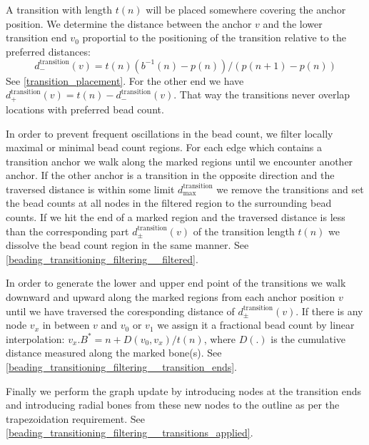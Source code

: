 A transition with length $t(n)$ will be placed somewhere covering the anchor position.
We determine the distance between the anchor $v$ and the lower transition end $v_0$ proportial to the positioning of the transition relative to the preferred distances: 
$$d_-^\text{transition}(v) =  t(n) (b^{-1}(n) - p(n) ) / (p(n+1) - p(n))$$
See \cref{transition_placement}.
For the other end we have $d_+^\text{transition}(v) = t(n) - d_-^\text{transition}(v)$.
That way the transitions never overlap locations with preferred bead count.

In order to prevent frequent oscillations in the bead count, we filter locally maximal or minimal bead count regions.
For each edge which contains a transition anchor we walk along the marked regions until we encounter another anchor.
If the other anchor is a transition in the opposite direction and the traversed distance is within some limit $d_\text{max}^\text{transition}$ we remove the transitions and set the bead counts at all nodes in the filtered region to the surrounding bead counts.
If we hit the end of a marked region and the traversed distance is less than the corresponding part $d_\pm^\text{transition}(v)$ of the transition length $t(n)$ we dissolve the bead count region in the same manner.
See \cref{beading_transitioning_filtering__filtered}.


In order to generate the lower and upper end point of the transitions we walk downward and upward along the marked regions from each anchor position $v$ until we have traversed the coresponding distance of $d_\pm^\text{transition}(v)$.
If there is any node $v_x$ in between $v$ and $v_0$ or $v_1$ we assign it a fractional bead count by linear interpolation: $v_x.B^* = n + D(v_0, v_x)/t(n)$, where $D(.)$ is the cumulative distance measured along the marked bone(s).
See \cref{beading_transitioning_filtering__transition_ends}.

Finally we perform the graph update by introducing nodes at the transition ends and introducing radial bones from these new nodes to the outline as per the trapezoidation requirement.
See \cref{beading_transitioning_filtering__transitions_applied}.


